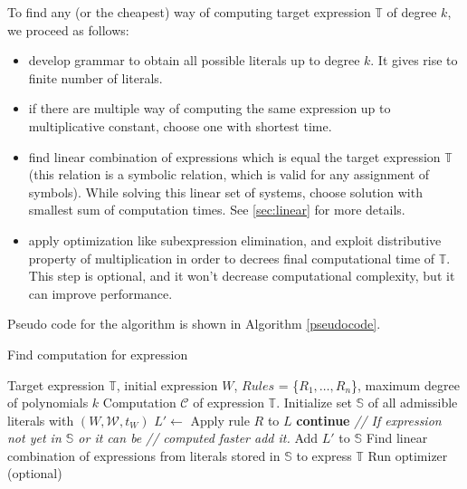 To find any (or the cheapest) way of computing target expression $\mathbb{T}$ of degree $k$, we proceed as follows: 
\begin{itemize}
\item develop grammar to obtain all possible literals up to degree $k$. It gives rise to finite number of literals. 
\item if there are multiple way of computing the same expression up to multiplicative constant, choose one with shortest time.
\item find linear combination of expressions which is equal the target
  expression $\mathbb{T}$ (this relation is a symbolic relation, which
  is valid for any assignment of symbols). While solving this linear
  set of systems, choose solution with smallest sum of computation
  times. See \ref{sec:linear} for more details.
\item apply optimization like subexpression elimination, and exploit distributive property of multiplication in order to decrees final computational time of $\mathbb{T}$. This step is optional, and it won't decrease computational complexity, but it can improve performance.
\end{itemize}

Pseudo code for the algorithm is shown in Algorithm \ref{pseudocode}.

\begin{algorithm}
\caption{Find computation for expression}
\begin{algorithmic} 
\REQUIRE Target expression $\mathbb{T}$, initial expression $W$, $Rules$ = \{$R_1, \dots, R_n$\}, maximum degree of polynomials $k$
\ENSURE Computation $\mathcal{C}$ of expression $\mathbb{T}$.
\STATE Initialize set $\mathbb{S}$ of all admissible literals with $(W, \mathcal{W}, t_W)$
\STATE $L' \gets$ Apply rule $R$ to $L$
  \STATE \textbf{continue}
\ENDIF
\STATE \emph{// If expression not yet in $\mathbb{S}$ or it can be}
\STATE \emph{// computed faster add it.}
  \STATE Add $L'$ to $\mathbb{S}$
\ENDIF
\ENDFOR
\ENDFOR
\ENDWHILE
\STATE Find linear combination of expressions from literals stored in $\mathbb{S}$ to express $\mathbb{T}$
\STATE Run optimizer (optional)
\end{algorithmic}
\label{pseudocode}
\end{algorithm}


